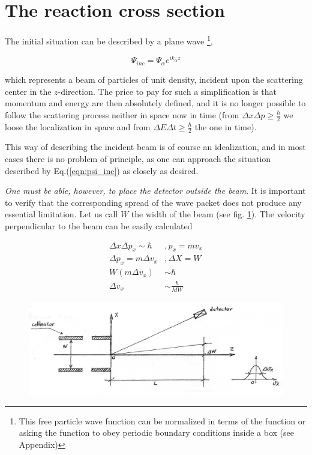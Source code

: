 \documentclass[a4paper,14pt]{book}
\begin{document}
\section{The reaction cross section}

The initial situation can be described by a plane wave \footnote{This free particle wave function can be normalized in terms of the function or asking the function to obey periodic boundary conditions inside a box (see Appendix)},

\begin{equation}
\Psi_{inc} = \Psi_{\alpha} e^{i k_{\alpha} z}
\label{eqn:psi_inc}
\end{equation}

\noindent which represents a beam of particles of unit density, incident upon the scattering center in the $z$-direction. The price to pay for such a simplification is that momentum and energy are then absolutely defined, and it is no longer possible to follow the scattering process neither in space now in time (from $\Delta x \Delta p \ge \frac{\hbar}{2}$ we loose the localization in space and from $\Delta E \Delta t \ge \frac{\hbar}{2}$ the one in time).

This way of describing the incident beam is of course an idealization, and in most cases there is no problem of principle, as one can approach the situation described by Eq.(\ref{eqn:psi_inc}) as closely as desired.

{\it One must be able, however, to place the detector outside the beam}. It is important to verify that the corresponding spread of the wave packet does not produce any essential limitation. Let us call $W$ the width of the beam (see fig. \ref{fig1st_1}). The velocity perpendicular to the beam can be easily calculated

\begin{equation}
\begin{array}{rl}
\Delta x \Delta p_x \sim \hbar &, p_x = m v_x \\
\Delta p_x = m \Delta v_x &, \Delta X = W \\
W(m \Delta v_x) &\sim \hbar \\
\Delta v_x &\sim \frac{\hbar}{MW}
\end{array}
\label{eqn:10}
\end{equation}
\begin{figure}
\centerline{\includegraphics*[width=\textwidth]{figs_C2/1_1}}
\caption{}\label{fig1st_1}
\end{figure}
\end{document}
